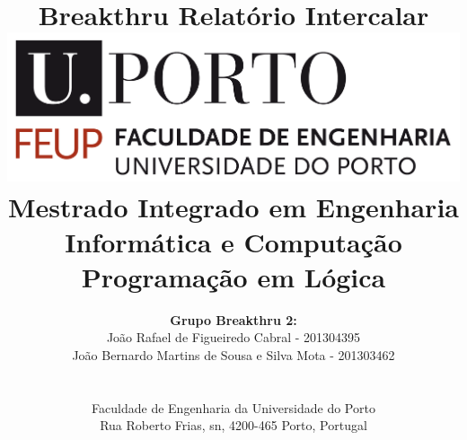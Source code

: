 \documentclass[a4paper]{article}
\begin{document}
\setlength{\textwidth}{16cm}
\setlength{\textheight}{22cm}

\title{\Huge\textbf{Breakthru}\linebreak\linebreak\linebreak
\Large\textbf{Relatório Intercalar}\linebreak\linebreak
\linebreak\linebreak
\includegraphics[scale=0.1]{feup-logo.png}\linebreak\linebreak
\linebreak\linebreak
\Large{Mestrado Integrado em Engenharia Informática e Computação} \linebreak\linebreak
\Large{Programação em Lógica}\linebreak
}

\author{\textbf{Grupo Breakthru 2:}\\
João Rafael de Figueiredo Cabral - 201304395 \\
João Bernardo Martins de Sousa e Silva Mota - 201303462 \\
\linebreak\linebreak \\
 \\ Faculdade de Engenharia da Universidade do Porto \\ Rua Roberto Frias, s\/n, 4200-465 Porto, Portugal \linebreak\linebreak\linebreak
\linebreak\linebreak\vspace{1cm}}

\maketitle
\thispagestyle{empty}
\end{document}
